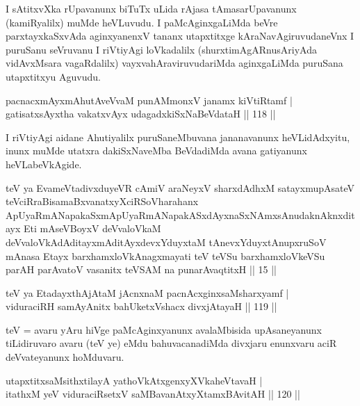 \begin{artha}
I sAtitxvXka rUpavanunx biTuTx uLida rAjasa tAmasarUpavanunx
(kamiRyalilx) muMde heVLuvudu. I paMcAginxgaLiMda beVre
parxtayxkaSxvAda aginxyanenxV tananx utapxtitxge kAraNavAgiruvudaneVnx I
puruSanu seVruvanu I riVtiyAgi loVkadalilx (shurxtimAgARnusAriyAda
vidAvxMsara vagaRdalilx) vayxvahAraviruvudariMda aginxgaLiMda puruSana
utapxtitxyu Aguvudu.
\end{artha}


\begin{shl}
pacnacxmAyxmAhutAveVvaM punAMmonxV janamx kiVtiRtamf | \\
gatisatxsAyxtha vakatxvAyx udagadxkiSxNaBeVdataH \hfill|| 118 || 
\end{shl}

\begin{artha}
I riVtiyAgi aidane Ahutiyalilx puruSaneMbuvana jananavanunx
heVLidAdxyitu, inunx muMde utatxra dakiSxNaveMba BeVdadiMda avana
gatiyanunx heVLabeVkAgide.
\end{artha}

\begin{shl}
teV ya EvameVtadivxduyeVR cAmiV araNeyxV sharxdAdhxM satayxmupAsateV teV\s ciRraBisamaBxvanatxyXciRSoV\s harahanx ApUyaRmANapakaSxmApUyaRmANapakASxdAyxnaSxNAmxsAnudaknAknxditayx Eti mAseVBoyxV deVvaloVkaM deVvaloVkAdAditayxmAditAyxdevxYduyxtaM tAnevxYduyxtAnupxruSoV mAnasa Etayx barxhamxloVkAnagxmayati teV teVSu barxhamxloVkeVSu parAH parAvatoV vasanitx teVSAM na punarAvaqtitxH || 15 ||
\end{shl}




\begin{shl}
teV ya EtadayxthAjAtaM jAcnxnaM pacnAcxginxsaMsharxyamf | \\
viduraciRH samAyAnitx bahUketxVshacx divxjAtayaH \hfill|| 119 || 
\end{shl}

\begin{artha}
teV = avaru yAru hiVge paMcAginxyanunx avalaMbisida upAsaneyanunx
tiLidiruvaro avaru (teV ye) eMdu bahuvacanadiMda divxjaru enunxvaru
aciR deVvateyanunx hoMduvaru.
\end{artha}

\begin{shl}
utapxtitxsaMsithxtilayA yathoVkAtxgenxyXVkaheVtavaH | \\
itathxM yeV viduraciRsetxV saMBavanAtxyXtamxBAvitAH \hfill|| 120 || 
\end{shl}

